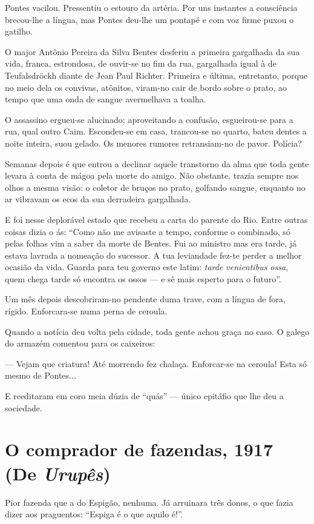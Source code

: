 Pontes vacilou. Pressentiu o estouro da artéria. Por uns instantes a
consciência brecou-lhe a língua, mas Pontes deu-lhe um pontapé e com voz
firme puxou o gatilho.

O major Antônio Pereira da Silva Bentes desferiu a primeira gargalhada
da sua vida, franca, estrondosa, de ouvir-se no fim da rua, gargalhada
igual à de Teufalsdröckh diante de Jean Paul Richter. Primeira e última,
entretanto, porque no meio dela os convivas, atônitos, viram-no cair de
bordo sobre o prato, ao tempo que uma onda de sangue avermelhava a
toalha.

O assassino ergueu-se alucinado; aproveitando a confusão, esgueirou-se
para a rua, qual outro Caim. Escondeu-se em casa, trancou-se no quarto,
bateu dentes a noite inteira, suou gelado. Os menores rumores
retransiam-no de pavor. Polícia?

Semanas depois é que entrou a declinar aquele transtorno da alma que
toda gente levara à conta de mágoa pela morte do amigo. Não obstante,
trazia sempre nos olhos a mesma visão: o coletor de bruços no prato,
golfando sangue, enquanto no ar vibravam os ecos da sua derradeira
gargalhada.

E foi nesse deplorável estado que recebeu a carta do parente do Rio.
Entre outras coisas dizia o ás: ``Como não me avisaste a tempo, conforme
o combinado, só pelas folhas vim a saber da morte de Bentes. Fui ao
ministro mas era tarde, já estava lavrada a nomeação do sucessor. A tua
leviandade fez-te perder a melhor ocasião da vida. Guarda para teu
governo este latim: \emph{tarde venientibus ossa}, quem chega tarde só
encontra os ossos --- e sê mais esperto para o futuro''.

Um mês depois descobriram-no pendente duma trave, com a língua de fora,
rígido. Enforcara-se numa perna de ceroula.

Quando a notícia deu volta pela cidade, toda gente achou graça no caso.
O galego do armazém comentou para os caixeiros:

--- Vejam que criatura! Até morrendo fez chalaça. Enforcar-se na
ceroula! Esta só mesmo de Pontes...

E reeditaram em coro meia dúzia de ``quás'' --- único epitáfio que lhe
deu a sociedade.

\chapter{O comprador de fazendas, 1917 (De \emph{Urupês})}

Pior fazenda que a do Espigão, nenhuma. Já arruinara três donos, o que
fazia dizer aos praguentos: ``Espiga é o que aquilo é!''.

